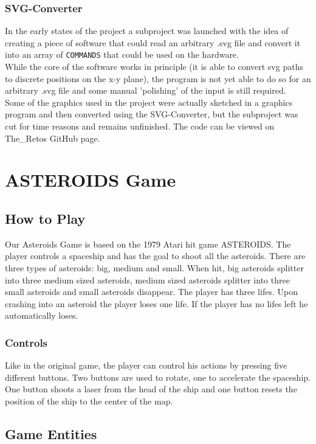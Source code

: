 \documentclass{report}
\begin{document}
\subsubsection{SVG-Converter}\label{svg-conv}
In the early states of the project a subproject was launched with the idea of creating a piece of software that could read an arbitrary .svg file and convert it into an array of \lstinline{COMMANDS} that could be used on the hardware. \\
While the core of the software works in principle (it is able to convert svg paths to discrete positions on the x-y plane), the program is not yet able to do so for an arbitrary .svg file and some manual 'polishing' of the input is still required.\\
Some of the graphics used in the project were actually sketched in a graphics program and then converted using the SVG-Converter, but the subproject was cut for time reasons and remains unfinished. The code can be viewed on The\_Retos GitHub page.
\section{ASTEROIDS Game}
\subsection{How to Play}\label{game_htp}
Our Asteroids Game is based on the 1979 Atari hit game ASTEROIDS. The player controls a spaceship and has the goal to shoot all the asteroids. There are three types of asteroids: big, medium and small. When hit, big asteroids splitter into three medium sized asteroids, medium sized asteroids splitter into three small asteroids and small asteroids disappear. The player has three lifes. Upon crashing into an asteroid the player loses one life. If the player has no lifes left he automatically loses.
\subsubsection{Controls}
Like in the original game, the player can control his actions by pressing five different buttons. Two buttons are used to rotate, one to accelerate the spaceship. One button shoots a laser from the head of the ship and one button resets the position of the ship to the center of the map.
\subsection{Game Entities}\label{game_entities}
\end{document}
